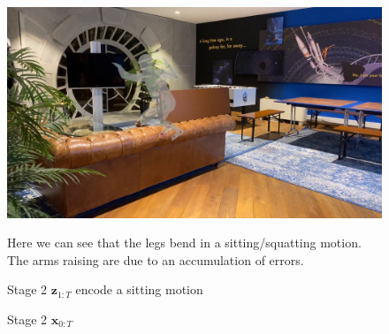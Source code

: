 \begin{figure}
    \centering
    \includegraphics[width=1\textwidth]{Figures/humor/improvement/Rollout_stage_2/sitting_clip/rollout_sitting_example/frame_00000078.jpg}
    \caption{Stage 2 $\mathbf{z}_{1:T}$ encode a sitting motion}
    \label{fig:humor_stage_2_rollout_sitting}
    \medskip
    \small
    \raggedright
    Here we can see that the legs bend in a sitting/squatting motion. The arms raising are due to an accumulation of errors. 
\end{figure}

\begin{figure}
    \centering
    \hfil
    \hfil
    \hfil
    \caption{Stage 2 $\mathbf{x}_{0:T}$}
    \label{fig:humor_stage_2}
\end{figure}


